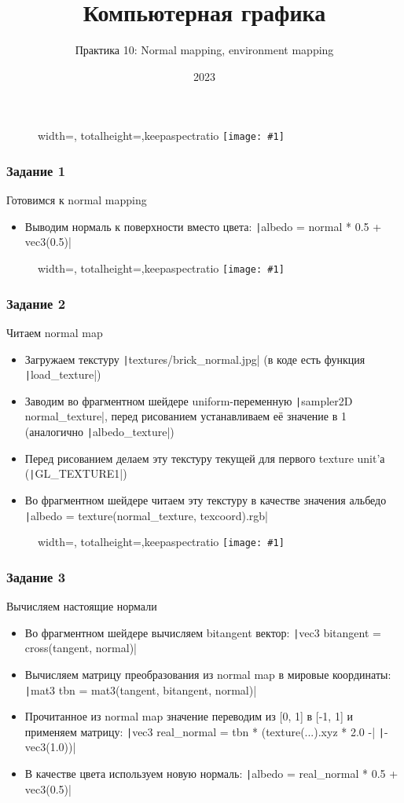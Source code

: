 \documentclass[10pt]{beamer}
\title{Компьютерная графика}
\subtitle{Практика 10: Normal mapping, environment mapping}
\date{2023}
\newcommand{\slideimage}[1]{
  \begin{figure}
    \begin{adjustbox}{width=\textwidth, totalheight=\textheight-2\baselineskip-2\baselineskip,keepaspectratio}
      \texttt{[image: \#1]}
    \end{adjustbox}
  \end{figure}
}
\begin{document}
\frame{\titlepage}

\begin{frame}[fragile]
\slideimage{0.png}
\end{frame}

\begin{frame}[fragile]
\frametitle{Задание 1}
Готовимся к normal mapping
\begin{itemize}
\item Выводим нормаль к поверхности вместо цвета: \texttt|albedo = normal * 0.5 + vec3(0.5)|
\end{itemize}
\end{frame}

\begin{frame}[fragile]
\slideimage{1.png}
\end{frame}

\begin{frame}[fragile]
\frametitle{Задание 2}
Читаем normal map
\begin{itemize}
\item Загружаем текстуру \texttt|textures/brick_normal.jpg| (в коде есть функция \texttt|load_texture|)
\item Заводим во фрагментном шейдере uniform-переменную \texttt|sampler2D normal_texture|, перед рисованием устанавливаем её значение в 1 (аналогично \texttt|albedo_texture|)
\item Перед рисованием делаем эту текстуру текущей для первого texture unit'а (\texttt|GL_TEXTURE1|)
\item Во фрагментном шейдере читаем эту текстуру в качестве значения альбедо \texttt|albedo = texture(normal_texture, texcoord).rgb|
\end{itemize}
\end{frame}

\begin{frame}[fragile]
\slideimage{2.png}
\end{frame}

\begin{frame}[fragile]
\frametitle{Задание 3}
Вычисляем настоящие нормали
\begin{itemize}
\item Во фрагментном шейдере вычисляем bitangent вектор: \texttt|vec3 bitangent = cross(tangent, normal)|
\item Вычисляем матрицу преобразования из normal map в мировые координаты: \texttt|mat3 tbn = mat3(tangent, bitangent, normal)|
\item Прочитанное из normal map значение переводим из [0, 1] в [-1, 1] и применяем матрицу: \texttt|vec3 real_normal = tbn * (texture(...).xyz * 2.0 -| \texttt|- vec3(1.0))|
\item В качестве цвета используем новую нормаль: \texttt|albedo = real_normal * 0.5 + vec3(0.5)|
\end{itemize}
\end{frame}
\end{document}
